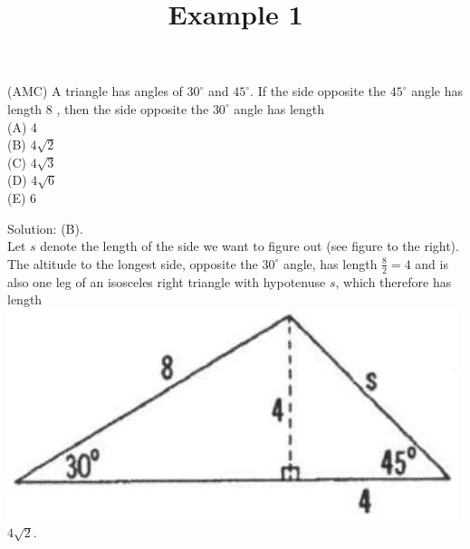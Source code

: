 \documentclass{article}
\title{Example 1}
\date{}
\begin{document}
\maketitle

(AMC) A triangle has angles of \(30^{\circ}\) and \(45^{\circ}\). If the side opposite the \(45^{\circ}\) angle has length 8 , then the side opposite the \(30^{\circ}\) angle has length\\
(A) 4\\
(B) \(4 \sqrt{2}\)\\
(C) \(4 \sqrt{3}\)\\
(D) \(4 \sqrt{6}\)\\
(E) 6

Solution: (B).\\
Let \(s\) denote the length of the side we want to figure out (see figure to the right). The altitude to the longest side, opposite the \(30^{\circ}\) angle, has length \(\frac{8}{2}=4\) and is also one leg of an isosceles right triangle with hypotenuse \(s\), which therefore has length\\
\includegraphics[width=\textwidth]{images/075(1).jpg} \(4 \sqrt{2}\).
\end{document}
